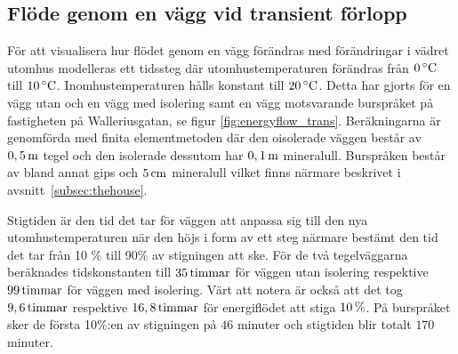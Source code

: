\subsection{Flöde genom en vägg vid transient förlopp}


För att visualisera hur flödet genom en vägg förändras med
förändringar i vädret utomhus modelleras ett tidssteg där utomhustemperaturen förändras från
$\unit[0]{^\circ C}$ till $\unit[10]{^\circ C}$. Inomhustemperaturen hålls konstant till $\unit[20]{^\circ C}$.
Detta har gjorts för en vägg utan och en vägg med isolering samt en vägg motsvarande burspråket på fastigheten på Walleriusgatan,
se figur \ref{fig:energyflow_trans}. Beräkningarna är genomförda med finita elementmetoden
där den oisolerade väggen består av $\unit[0,5]{m}$ tegel och den isolerade dessutom har $\unit[0,1]{m}$ mineralull. Burspråken
består av bland annat gips och $\unit[5]{cm}$ mineralull vilket finns närmare beskrivet i avsnitt~\ref{subsec:thehouse}.

Stigtiden är den tid det tar för väggen att anpassa sig till den nya utomhustemperaturen när den höjs i form av ett steg närmare bestämt den tid det tar från 10 \% till 90\% av stigningen att ske.
För de två tegelväggarna beräknades tidskonstanten till $\unit[35]{timmar}$ för väggen utan isolering
respektive $\unit[99]{timmar}$ för väggen med isolering. 
Värt att notera är också att det tog $\unit[9,6]{timmar}$ respektive $\unit[16,8]{timmar}$ för energiflödet att stiga $\unit[10]{\%}$. 
På burspråket sker de första 10\%:en av stigningen på $46$ minuter och stigtiden blir totalt $170$ minuter.

